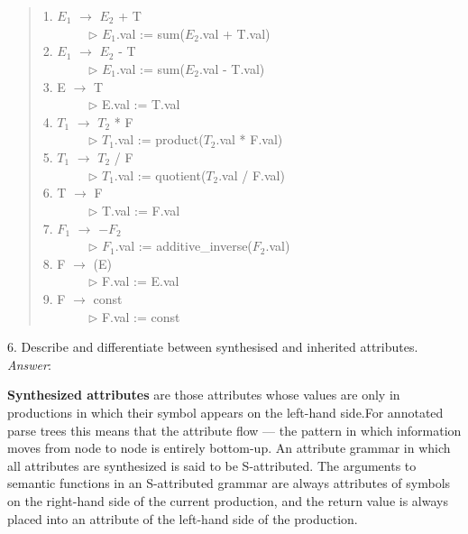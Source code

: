 \documentclass[a4paper,12pt]{article}
\begin{document}
\begin{quote}
1. $E_1$ $\longrightarrow$ $E_2$ + T \\
\verb+       +$\triangleright$ $E_1$.val := sum($E_2$.val + T.val)\\
2. $E_1$ $\longrightarrow$ $E_2$ - T \\
\verb+       +$\triangleright$ $E_1$.val := sum($E_2$.val - T.val)\\
3. E $\longrightarrow$  T \\
\verb+       +$\triangleright$ E.val := T.val\\
4. $T_1$ $\longrightarrow$ $T_2$ * F \\
\verb+       +$\triangleright$ $T_1$.val := product($T_2$.val * F.val)\\
5. $T_1$ $\longrightarrow$ $T_2$ / F \\
\verb+       +$\triangleright$ $T_1$.val := quotient($T_2$.val / F.val)\\
6. T $\longrightarrow$  F \\
\verb+       +$\triangleright$ T.val := F.val\\
7. $F_1$ $\longrightarrow$ $-F_2$\\
\verb+       +$\triangleright$ $F_1$.val := additive\_inverse($F_2$.val)\\
8. F $\longrightarrow$  (E) \\
\verb+       +$\triangleright$ F.val := E.val\\
9. F $\longrightarrow$ const\\
\verb+       +$\triangleright$ F.val := const\\
\end{quote}

6. Describe and differentiate between synthesised and inherited attributes.\\
\emph{Answer}:

\textbf{Synthesized attributes} are those attributes whose values are only in productions in which their symbol appears on the left-hand side.For annotated parse trees this means that the attribute flow --- the pattern in
which information moves from node to node is entirely bottom-up.    An attribute grammar in which all attributes are synthesized is said to be S-attributed. The arguments to semantic functions in an S-attributed grammar are always attributes of symbols on the right-hand side of the current production, and the return value is always placed into an attribute of the left-hand
side of the production.
\end{document}
